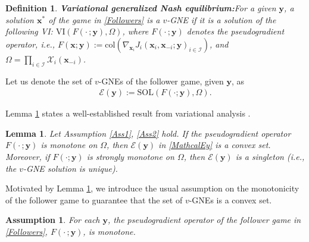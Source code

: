 \documentclass[letterpaper, 10 pt, conference]{ieeeconf}
\newcommand\xbf{\mathbf{x}}
\newcommand\ybf{\mathbf{y}}
\newtheorem{lemma}{Lemma}
\newtheorem{definition}{Definition}
\newtheorem{assumption}{Assumption}
\begin{document}
\begin{definition}{\textbf{Variational generalized Nash equilibrium:}}\label{vGNE}
For a given $\ybf$, a solution $\xbf^*$ of the game in \eqref{Followers} is a $v$-GNE if it is a solution of the following VI: $\mathrm{VI}(F(\cdot\,; \ybf), \Omega)$, where $F(\cdot\,; \ybf)$ denotes the pseudogradient operator, i.e., $F(\xbf; \ybf):=\mathrm{col}(\nabla_{\xbf_i} J_i(\xbf_i, \xbf_{-i};\ybf)_{i \in \mathcal{I}})$, and $\Omega=\prod_{i \in \mathcal{I}}\mathcal{X}_i(\xbf_{-i})$.
\end{definition}
Let us denote the set of $v$-GNEs of the follower game, given $\ybf$, as \begin{align}\label{MathcalEy}
\mathcal{E}(\ybf):=\mathrm{SOL}(F(\cdot;\ybf), \Omega).
\end{align}

Lemma \ref{ORA} states a well-established result from variational analysis \cite[Theorem 2.4.8]{facchinei2003finite}. 
\begin{lemma}\label{ORA}
    Let Assumption \ref{Ass1}, \ref{Ass2} hold. If the pseudogradient operator $F(\cdot\,;\ybf)$ is monotone on $\Omega$, then $\mathcal{E}(\ybf)$ in \eqref{MathcalEy} is a convex set. Moreover, if $F(\cdot;\ybf)$ is strongly monotone on $\Omega$, then $\mathcal{E}(\ybf)$ is a singleton (i.e., the $v$-GNE solution is unique). 
\end{lemma}
Motivated by Lemma \ref{ORA}, we introduce the usual assumption on the monotonicity of the follower game to guarantee that the set of $v$-GNEs is a convex set. 
\begin{assumption}\label{ConvexSet}
    For each $\ybf$, the pseudogradient operator of the follower game in \eqref{Followers}, $F(\cdot\,;\ybf)$, is monotone.
\end{assumption}
\end{document}
